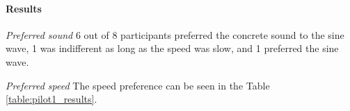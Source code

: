 \paragraph{Results} \hfill

\textit{Preferred sound} 6 out of 8 participants preferred the concrete sound to the sine wave, 1 was indifferent as long as the speed was slow, and 1 preferred the sine wave.

\textit{Preferred speed} The speed preference can be seen in the Table \ref{table:pilot1_results}.

\begin{figure}
	\centering
	

\end{figure}
